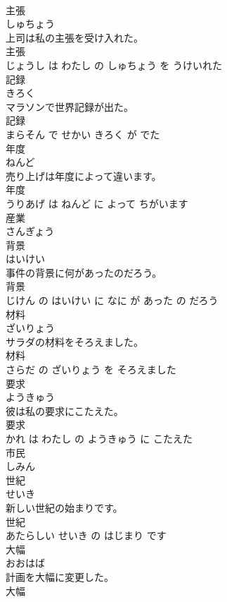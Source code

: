 \documentclass[8pt]{extreport}
\begin{document}
\begin{CJK}{UTF8}{min}
\\	主張	
\\	しゅちょう			
\\	上司は私の主張を受け入れた。	
\\	主張 
\\	じょうし は わたし の しゅちょう を うけいれた			
\\	記録	
\\	きろく			
\\	マラソンで世界記録が出た。	
\\	記録 
\\	まらそん で せかい きろく が でた			
\\	年度	
\\	ねんど			
\\	売り上げは年度によって違います。	
\\	年度 
\\	うりあげ は ねんど に よって ちがいます			
\\	産業	
\\	さんぎょう			
\\	背景	
\\	はいけい			
\\	事件の背景に何があったのだろう。	
\\	背景 
\\	じけん の はいけい に なに が あった の だろう			
\\	材料	
\\	ざいりょう			
\\	サラダの材料をそろえました。	
\\	材料 
\\	さらだ の ざいりょう を そろえました			
\\	要求	
\\	ようきゅう			
\\	彼は私の要求にこたえた。	
\\	要求 
\\	かれ は わたし の ようきゅう に こたえた			
\\	市民	
\\	しみん			
\\	世紀	
\\	せいき			
\\	新しい世紀の始まりです。	
\\	世紀 
\\	あたらしい せいき の はじまり です			
\\	大幅	
\\	おおはば			
\\	計画を大幅に変更した。	
\\	大幅 

\end{CJK}
\end{document}
